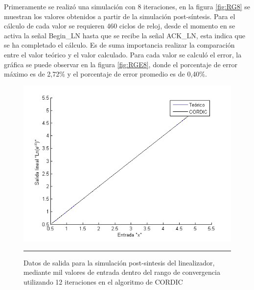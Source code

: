 Primeramente se realizó una simulación con 8 iteraciones, en la figura \ref{fig:RG8} se muestran los valores obtenidos a partir de la simulación post-síntesis. Para el cálculo de cada valor se requieren 460 ciclos de reloj, desde el momento en se activa la señal Begin\_LN hasta que se recibe la señal ACK\_LN, esta indica que se ha completado el cálculo. Es de suma importancia realizar la comparación entre el valor teórico y el valor calculado. Para cada valor se calculó el error, la gráfica se puede observar en la figura \ref{fig:RGE8}, donde el porcentaje de error máximo es de 2,72\% y el porcentaje de error promedio es de 0,40\%. 

\newpage 
 
\begin{figure}[H]
  \centering
    \includegraphics[scale=0.8]{./RANGO_12iter.png}
    \rule{35em}{0.5pt}
  \caption[Datos de salida para la simulación post-sintesis del linealizador, mediante mil valores de entrada dentro del rango de convergencia utilizando 12 iteraciones en el algoritmo de CORDIC]{Datos de salida para la simulación post-sintesis del linealizador, mediante mil valores de entrada dentro del rango de convergencia utilizando 12 iteraciones en el algoritmo de CORDIC}
  \label{fig:RG12}
\end{figure}

